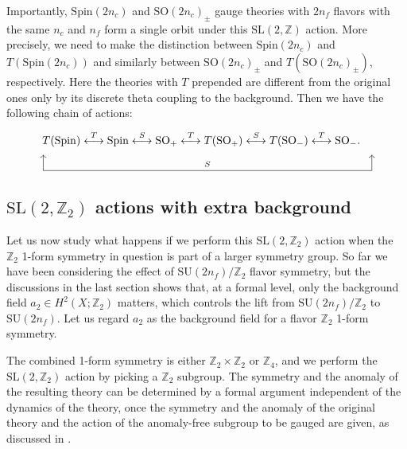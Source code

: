 \documentclass[12pt]{article}
\numberwithin{equation}{section}
\def\bZ{\mathbb{Z}}
\def\SU{\mathrm{SU}}
\def\SO{\mathrm{SO}}
\def\Spin{\mathrm{Spin}}
\def\SL{\mathrm{SL}}
\begin{document}
Importantly, $\Spin(2n_c)$ and $\SO(2n_c)_\pm$  gauge theories with $2n_f$ flavors with the same $n_c$ and $n_f$ form a single orbit under this $\SL(2,\bZ)$ action.
More precisely, we need to make the distinction between $\Spin(2n_c)$ and $T(\Spin(2n_c))$ and  similarly between $\SO(2n_c)_\pm$ and $T(\SO(2n_c)_\pm)$, respectively.
Here the theories with $T$ prepended are different from the original ones only by its discrete theta coupling to the background.
Then we have the following chain of actions: \begin{equation}
\begin{tikzpicture}
	\node at (0,0) {$
		T(\Spin) \stackrel{T}{\longleftrightarrow} 
		\Spin \stackrel{S}{\longleftrightarrow} 
		\SO_+ \stackrel{T}{\longleftrightarrow} 
		T(\SO_+) \stackrel{S}{\longleftrightarrow} 
		T(\SO_-) \stackrel{T}{\longleftrightarrow} 
		\SO_-.
	$};
	\draw[->] (-5,-1) -- (-5,-0.5);
	\draw[->] (5.4,-1) -- (5.4,-0.5);
	\draw (-5,-1) -- node[above] {\scriptsize $S$} (5.4,-1);
\end{tikzpicture}
\label{sl2z-on-so}
\end{equation}

\subsection{$\SL(2,\bZ_2)$ actions with extra background}

Let us now study what happens if we perform this $\SL(2,\bZ_2)$ action when the $\bZ_2$ 1-form symmetry in question is part of a larger symmetry group.
So far we have been considering the effect of $\SU(2n_f)/\bZ_2$ flavor symmetry,
but the discussions in the last section shows that, at a formal level, only the background field $a_2 \in H^2(X;\bZ_2)$ matters, which controls the lift from $\SU(2n_f)/\bZ_2$ to $\SU(2n_f)$.
Let us regard $a_2$ as the background field for a flavor $\bZ_2$ 1-form symmetry.

The combined 1-form symmetry is either $\bZ_2\times \bZ_2$ or $\bZ_4$,
and we perform the $\SL(2,\bZ_2)$ action  by picking a $\bZ_2$ subgroup.
The symmetry and the anomaly of the resulting theory can be determined by a formal argument independent of the dynamics of the theory,
once the symmetry and the anomaly of the original theory 
and the action of the anomaly-free subgroup to be gauged are given, as discussed in \cite{Tachikawa:2017gyf}.
\end{document}
